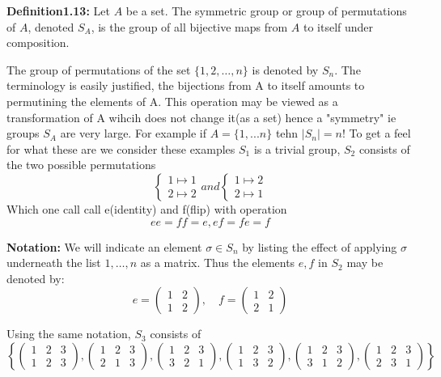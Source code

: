 \textbf{Definition1.13:} Let $A$ be a set. The symmetric group or group of permutations of $A$, denoted $S_A$, is the group of all bijective maps from $A$ to itself under composition. %

The group of permutations of the set $\{1, 2, \ldots, n\}$ is denoted by $S_n$. %
The terminology is easily justified, the bijections from A to itself amounts to permutining the elements of A. This operation may be viewed as a transformation of A wihcih does not change it(as a set) hence a "symmetry" ie groups $S_A$ are very large. For example if $A = \{1,...n\}$ tehn $|S_n| = n!$
To get a feel  for what these are we consider these examples
$S_1$ is a trivial group, $S_2$ consists of the two possible permutations
$$
\begin{cases}
1 \mapsto 1\\
2 \mapsto 2
\end{cases}
and \begin{cases}
    1 \mapsto 2 \\
    2 \mapsto 1
\end{cases}
$$
Which one call call e(identity) and f(flip) with operation
$$ee=ff=e, ef=fe=f$$

\textbf{Notation:} We will indicate an element $\sigma \in S_n$ by listing the effect of applying $\sigma$ underneath the list $1, \ldots, n$ as a matrix. %
Thus the elements $e, f$ in $S_2$ may be denoted by: %
$$e = \begin{pmatrix} 1 & 2 \\ 1 & 2 \end{pmatrix}, \quad f = \begin{pmatrix} 1 & 2 \\ 2 & 1 \end{pmatrix}$$ %

Using the same notation, $S_3$ consists of
$$ \left\{ \begin{pmatrix} 1 & 2 & 3 \\ 1 & 2 & 3 \end{pmatrix}, \begin{pmatrix} 1 & 2 & 3 \\ 2 & 1 & 3 \end{pmatrix}, \begin{pmatrix} 1 & 2 & 3 \\ 3 & 2 & 1 \end{pmatrix}, \begin{pmatrix} 1 & 2 & 3 \\ 1 & 3 & 2 \end{pmatrix}, \begin{pmatrix} 1 & 2 & 3 \\ 3 & 1 & 2 \end{pmatrix}, \begin{pmatrix} 1 & 2 & 3 \\ 2 & 3 & 1 \end{pmatrix} \right\} $$

